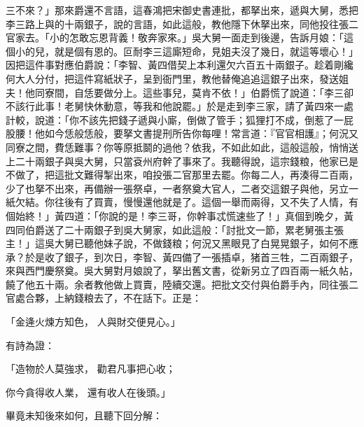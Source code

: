 三不來？」那來爵還不言語，這春鴻把宋御史書連批，都拏出來，遞與大舅，悉把李三路上與的十兩銀子，說的言語，如此這般，教他隱下休拏出來，同他投往張二官家去。「小的怎敢忘恩背義！敬奔家來。」吳大舅一面走到後邊，告訴月娘：「這個小的兒，就是個有恩的。叵耐李三這廝短命，見姐夫沒了幾日，就這等壞心！」因把這件事對應伯爵說：「李智、黃四借契上本利還欠六百五十兩銀子。趁着剛纔何大人分付，把這件寫紙狀子，呈到衙門里，教他替俺追追這銀子出來，發送姐夫！他同寮間，自恁要做分上。這些事兒，莫肯不依！」伯爵慌了說道：「李三卻不該行此事！老舅快休動意，等我和他說罷。」於是走到李三家，請了黃四來一處計較，說道：「你不該先把錢子遞與小廝，倒做了管手；狐狸打不成，倒惹了一屁股腰！他如今恁般恁般，要拏文書提刑所告你每哩！常言道：『官官相護』；何況又同寮之間，費恁難事？你等原抵鬬的過他？依我，不如此如此，這般這般，悄悄送上二十兩銀子與吳大舅，只當袞州府幹了事來了。我聽得說，這宗錢粮，他家已是不做了，把這批文難得掣出來，咱投張二官那里去罷。你每二人，再湊得二百兩，少了也拏不出來，再備辦一張祭卓，一者祭奠大官人，二者交這銀子與他，另立一紙欠結。你往後有了買賣，慢慢還他就是了。這個一舉而兩得，又不失了人情，有個始終！」黃四道：「你說的是！李三哥，你幹事忒慌速些了！」真個到晚夕，黃四同伯爵送了二十兩銀子到吳大舅家，如此這般：「討批文一節，累老舅張主張主！」這吳大舅已聽他妹子說，不做錢粮；何況又黑眼見了白晃晃銀子，如何不應承？於是收了銀子，到次日，李智、黃四備了一張插卓，猪首三牲，二百兩銀子，來與西門慶祭奠。吳大舅對月娘說了，拏出舊文書，從新另立了四百兩一紙久帖，饒了他五十兩。余者教他做上買賣，陸續交還。把批文交付與伯爵手內，同往張二官處合夥，上納錢粮去了，不在話下。正是：

「金逄火煉方知色，  人與財交便見心。」

有詩為證：

「造物於人莫強求，  勸君凡事把心收；

你今貪得收人業，  還有收人在後頭。」

畢竟未知後來如何，且聽下回分解：


